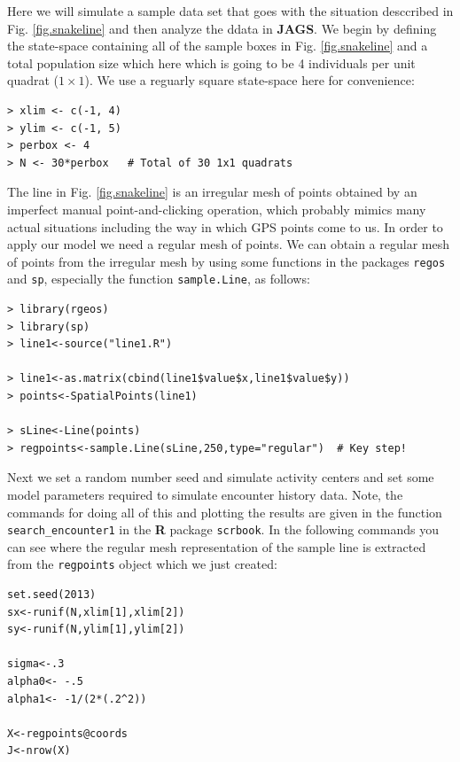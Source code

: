 Here we will simulate a sample data set that goes with the situation
desccribed in Fig. \ref{fig.snakeline} and then analyze the ddata in
{\bf JAGS}. 
We begin by defining the state-space containing all of the sample
boxes in Fig. \ref{fig.snakeline} and a total population size which here which is going
to be 4 individuals per unit quadrat ($1 \times 1$). We use a reguarly
square state-space here for convenience:
\begin{verbatim}
> xlim <- c(-1, 4)
> ylim <- c(-1, 5)
> perbox <- 4
> N <- 30*perbox   # Total of 30 1x1 quadrats
\end{verbatim}
The line in Fig. \ref{fig.snakeline}  is an irregular mesh of points
obtained by an imperfect manual point-and-clicking operation, which
probably mimics many actual situations including the way in which GPS
points come to us. In order to apply our model we need a regular mesh
of points. We can obtain a regular mesh of points from the irregular
mesh by using 
some functions in the packages \mbox{\tt regos}
and \mbox{\tt sp}, especially the function \mbox{\tt sample.Line}, as follows:
\begin{verbatim}
> library(rgeos)
> library(sp)
> line1<-source("line1.R")

> line1<-as.matrix(cbind(line1$value$x,line1$value$y))
> points<-SpatialPoints(line1)

> sLine<-Line(points)
> regpoints<-sample.Line(sLine,250,type="regular")  # Key step! 
\end{verbatim}
Next we set a random number seed and simulate activity centers and set
some model parameters required to simulate encounter history data. 
Note, the commands for doing all of this and plotting the results are given
in the function \mbox{\tt search_encounter1} in the {\bf R} package
\mbox{\tt scrbook}. In the following commands you can see where the
regular mesh representation of the sample line is extracted from the
\mbox{\tt regpoints} object which we just created:
\begin{verbatim}
set.seed(2013)
sx<-runif(N,xlim[1],xlim[2])
sy<-runif(N,ylim[1],ylim[2])

sigma<-.3
alpha0<- -.5
alpha1<- -1/(2*(.2^2))

X<-regpoints@coords
J<-nrow(X)
\end{verbatim}

